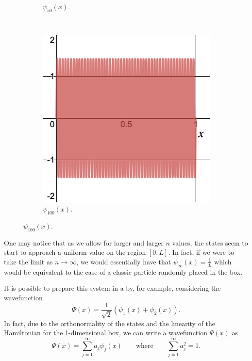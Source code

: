 \begin{figure}[H]
\begin{subfigure}[h]{0.3\textwidth}
        \caption{$\psi_{50}(x)$.}
    \end{subfigure}
    ~
    \begin{subfigure}[h]{0.3\textwidth}
        \includegraphics[width=\textwidth]{Figures_Part_2/state_100.png}
        \caption{$\psi_{100}(x)$.}
    \end{subfigure}
        \end{figure}

\noindent One may notice that as we allow for larger and larger $n$ values, the states seem to start to approach a uniform value on the region $[0,L]$. In fact, if we were to take the limit as $n\to \infty$, we would essentially have that $\psi_\infty(x) = \frac{1}{L}$ which would be equivalent to the case of a classic particle randomly placed in the box.

It is possible to prepare this system in a  by, for example, considering the wavefunction
\[
\Psi(x) = \frac{1}{\sqrt{2}}\left(\psi_1(x) + \psi_2(x)\right).
\]
In fact, due to the orthonormality of the states and the linearity of the Hamiltonian for the 1-dimensional box, we can write a wavefunction $\Psi(x)$ as
\[
\boxed{\Psi(x)=\sum_{j=1}^\infty a_j \psi_j(x) \qquad \textrm{where}\qquad \sum_{j=1}^\infty a_j^2 = 1.}
\]

